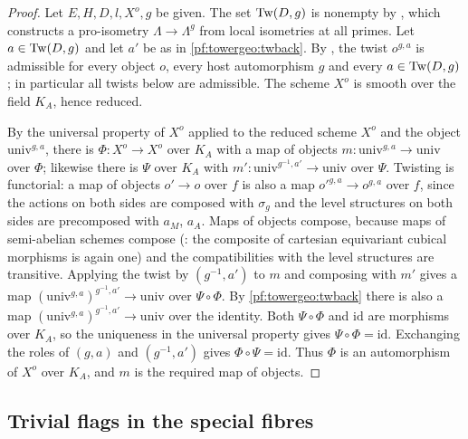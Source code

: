 \begin{proof}
Let $E,H,D,l,X^o,g$ be given. The set $\mathrm{Tw}(D,g)$ is nonempty by
, which constructs a pro-isometry
$\Lambda\to\Lambda^g$ from local isometries at all primes. Let $a\in\mathrm{Tw}(D,g)$ and let $a'$ be as in
\cref{pf:towergeo:twback}. By , the twist $o^{g,a}$ is admissible for
every object $o$, every host automorphism $g$ and every $a\in\mathrm{Tw}(D,g)$; in particular all twists
below are admissible. The scheme $X^o$ is smooth over the field $K_A$, hence reduced.

By the universal property of $X^o$ applied to the reduced scheme $X^o$ and the object
$\mathrm{univ}^{g,a}$, there is $\Phi\colon X^o\to X^o$ over $K_A$ with a map of objects
$m\colon\mathrm{univ}^{g,a}\to\mathrm{univ}$ over $\Phi$; likewise there is $\Psi$ over $K_A$ with
$m'\colon\mathrm{univ}^{g^{-1},a'}\to\mathrm{univ}$ over $\Psi$. Twisting is functorial: a map of objects
$o'\to o$ over $f$ is also a map $o'^{g,a}\to o^{g,a}$ over $f$, since the actions on both sides are
composed with $\sigma_g$ and the level structures on both sides are precomposed with $a_M$, $a_A$. Maps of
objects compose, because maps of semi-abelian schemes compose
(: the composite of cartesian equivariant
cubical morphisms is again one) and the compatibilities with the level structures are transitive.
Applying the twist by $(g^{-1},a')$ to $m$ and composing with $m'$ gives a map
$(\mathrm{univ}^{g,a})^{g^{-1},a'}\to\mathrm{univ}$ over $\Psi\circ\Phi$. By \cref{pf:towergeo:twback}
there is also a map $(\mathrm{univ}^{g,a})^{g^{-1},a'}\to\mathrm{univ}$ over the identity. Both
$\Psi\circ\Phi$ and $\mathrm{id}$ are morphisms over $K_A$, so the uniqueness in the universal property
gives $\Psi\circ\Phi=\mathrm{id}$. Exchanging the roles of $(g,a)$ and $(g^{-1},a')$ gives
$\Phi\circ\Psi=\mathrm{id}$. Thus $\Phi$ is an automorphism of $X^o$ over $K_A$, and $m$ is the required
map of objects.
\end{proof}

\subsection{Trivial flags in the special fibres}\label{pf:towergeo:sec-triv}

